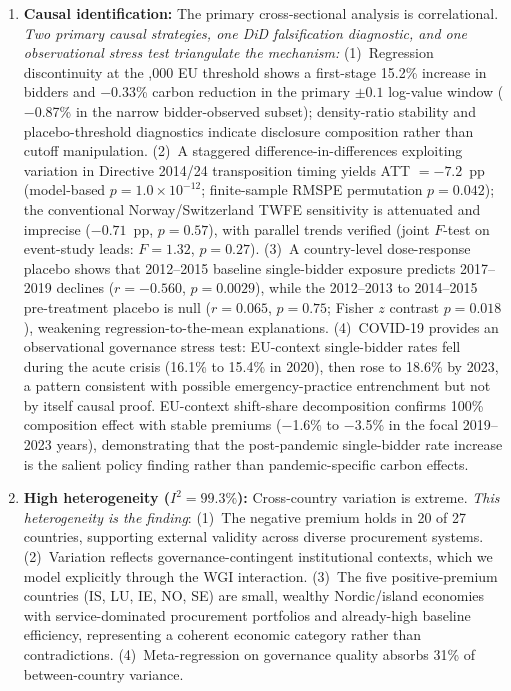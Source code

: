 \documentclass[11pt]{article}
\begin{document}
\begin{enumerate}
\item \textbf{Causal identification:} The primary cross-sectional analysis is correlational. \textit{Two primary causal strategies, one DiD falsification diagnostic, and one observational stress test triangulate the mechanism:} (1)~Regression discontinuity at the ,000 EU threshold shows a first-stage 15.2\% increase in bidders and $-$0.33\% carbon reduction in the primary $\pm0.1$ log-value window ($-$0.87\% in the narrow bidder-observed subset); density-ratio stability and placebo-threshold diagnostics indicate disclosure composition rather than cutoff manipulation. (2)~A staggered difference-in-differences exploiting variation in Directive 2014/24 transposition timing yields ATT $= -7.2$~pp (model-based $p = 1.0 \times 10^{-12}$; finite-sample RMSPE permutation $p = 0.042$); the conventional Norway/Switzerland TWFE sensitivity is attenuated and imprecise ($-0.71$~pp, $p = 0.57$), with parallel trends verified (joint $F$-test on event-study leads: $F = 1.32$, $p = 0.27$). (3)~A country-level dose-response placebo shows that 2012--2015 baseline single-bidder exposure predicts 2017--2019 declines ($r = -0.560$, $p = 0.0029$), while the 2012--2013 to 2014--2015 pre-treatment placebo is null ($r = 0.065$, $p = 0.75$; Fisher $z$ contrast $p = 0.018$), weakening regression-to-the-mean explanations. (4)~COVID-19 provides an observational governance stress test: EU-context single-bidder rates fell during the acute crisis (16.1\% to 15.4\% in 2020), then rose to 18.6\% by 2023, a pattern consistent with possible emergency-practice entrenchment but not by itself causal proof. EU-context shift-share decomposition confirms 100\% composition effect with stable premiums ($-$1.6\% to $-$3.5\% in the focal 2019--2023 years), demonstrating that the post-pandemic single-bidder rate increase is the salient policy finding rather than pandemic-specific carbon effects.

\item \textbf{High heterogeneity ($I^2 = 99.3\%$):} Cross-country variation is extreme. \textit{This heterogeneity is the finding}: (1)~The negative premium holds in 20 of 27 countries, supporting external validity across diverse procurement systems. (2)~Variation reflects governance-contingent institutional contexts, which we model explicitly through the WGI interaction. (3)~The five positive-premium countries (IS, LU, IE, NO, SE) are small, wealthy Nordic/island economies with service-dominated procurement portfolios and already-high baseline efficiency, representing a coherent economic category rather than contradictions. (4)~Meta-regression on governance quality absorbs 31\% of between-country variance.


\end{enumerate}
\end{document}

